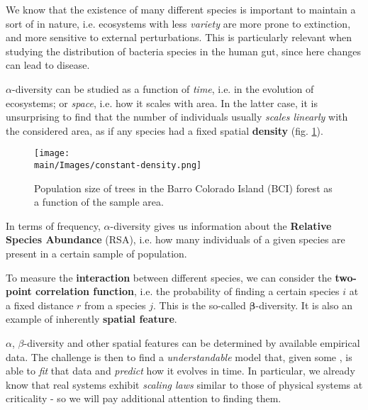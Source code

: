 \documentclass[../../main.tex]{subfiles}
\begin{document}
We know that the existence of many different species is important to maintain a sort of  in nature, i.e. ecosystems with less \textit{variety} are more prone to extinction, and more sensitive to external perturbations. This is particularly relevant when studying the distribution of bacteria species in the human gut, since here changes can lead to disease.  

\medskip

$\alpha$-diversity can be studied as a function of \textit{time}, i.e. in the evolution of ecosystems; or \textit{space}, i.e. how it scales with area. In the latter case, it is unsurprising to find that the number of individuals usually \textit{scales linearly} with the considered area, as if any species had a fixed spatial \textbf{density} (fig. \ref{fig:constant-density}).

\begin{figure}[H]
    \centering
    \texttt{[image: \\main/Images/constant-density.png]}
    \caption{Population size of trees in the Barro Colorado Island (BCI) forest as a function of the sample area.}
    \label{fig:constant-density}
\end{figure}

In terms of frequency, $\alpha$-diversity gives us information about the \textbf{Relative Species Abundance} (RSA), i.e. how many individuals of a given species are present in a certain sample of population.

\medskip

To measure the \textbf{interaction} between different species, we can consider the \textbf{two-point correlation function}, i.e. the probability of finding a certain species $i$ at a fixed distance $r$ from a species $j$. This is the so-called $\bm{\beta}$-diversity. It is also an example of inherently \textbf{spatial feature}. 
\medskip

$\alpha$, $\beta$-diversity and other spatial features can be determined by available empirical data. The challenge is then to find a \textit{understandable} model that, given some , is able to \textit{fit} that data and \textit{predict} how it evolves in time. In particular, we already know that real systems exhibit \textit{scaling laws} similar to those of physical systems at criticality - so we will pay additional attention to finding them.
\end{document}
